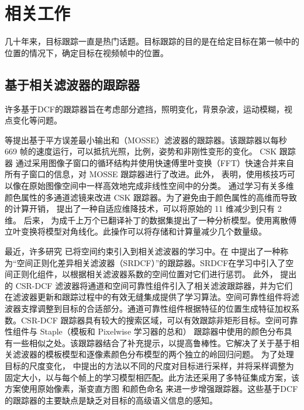 \section{相关工作}
几十年来，目标跟踪一直是热门话题。目标跟踪的目的是在给定目标在第一帧中的位置的情况下，确定目标在视频帧中的位置。

\subsection{基于相关滤波器的跟踪器}
许多基于DCF的跟踪器旨在考虑部分遮挡，照明变化，背景杂波，运动模糊，视点变化等问题。

\cite{bolme2010visual} 等提出基于平方误差最小输出和（MOSSE）滤波器的跟踪器。该跟踪器以每秒 669 帧的速度运行，可以抵抗光照，比例，姿势和非刚性变形的变化。
CSK 跟踪器 \cite{Henriques2012ExploitingTC} 通过采用图像子窗口的循环结构并使用快速傅里叶变换（FFT）快速合并来自所有子窗口的信息，对 MOSSE 跟踪器进行了改进。此外， \cite{Henriques2012ExploitingTC} 表明，使用核技巧可以像在原始图像空间中一样高效地完成非线性空间中的分类。
\cite{Danelljan2014AdaptiveCA} 通过学习有关多维颜色属性的多通道滤镜来改进 CSK 跟踪器。为了避免由于颜色属性的高维而导致的计算开销，\cite{Danelljan2014AdaptiveCA} 提出了一种自适应维降技术，可以将原始的 11 维减少到只有 2 维。
后来，\cite{henriques2014high-speed} 为成千上万个已翻译补丁的数据集提出了一种分析模型。使用离散傅立叶变换将模型对角线化。此操作可以将存储和计算量减少几个数量级。

最近，许多研究 \cite{Danelljan2015LearningSR, Lukezic2017DiscriminativeCF} 已将空间约束引入到相关滤波器的学习中。在 \cite{Danelljan2015LearningSR} 中提出了一种称为“空间正则化差异相关滤波器（SRDCF）”的跟踪器。SRDCF在学习中引入了空间正则化组件，以根据相关滤波器系数的空间位置对它们进行惩罚。
此外，\cite{Lukezic2017DiscriminativeCF} 提出的 CSR-DCF 滤波器将通道和空间可靠性组件引入了相关滤波跟踪器，并为它们在滤波器更新和跟踪过程中的有效无缝集成提供了学习算法。空间可靠性组件将滤波器支撑调整到目标的合适部分。通道可靠性组件根据特征的位置生成特征加权系数。CSR-DCF 跟踪器具有较大的搜索区域，可以有效跟踪非矩形目标。空间可靠性组件与 Staple（模板和 Pixelwise 学习器的总和） \cite{Bertinetto2016StapleC} 跟踪器中使用的颜色分布具有一些相似之处。该跟踪器结合了补充提示，以提高鲁棒性。它解决了关于基于相关滤波器的模板模型和逐像素颜色分布模型的两个独立的岭回归问题。
为了处理目标的尺度变化， \cite{Li2014ASA} 中提出的方法以不同的尺度对目标进行采样，并将采样调整为固定大小，以与每个帧上的学习模型相匹配。此方法还采用了多特征集成方案，该方案使用原始像素，渐变直方图 \cite{Forsyth2014ObjectDW} 和颜色命名 \cite{Weijer2009LearningCN} 来进一步增强跟踪器。这些基于DCF的跟踪器的主要缺点是缺乏对目标的高级语义信息的感知。


